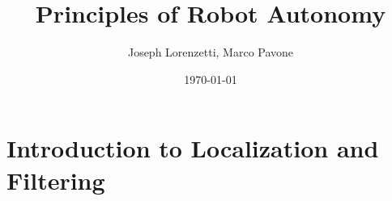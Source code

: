 \documentclass[nohyper,nobib]{tufte-book}
\title{Principles of Robot Autonomy}
\author{Joseph Lorenzetti, Marco Pavone}
\date{\today}
\begin{document}
\chapter{Introduction to Localization and Filtering}


\printbibliography
\end{document}
